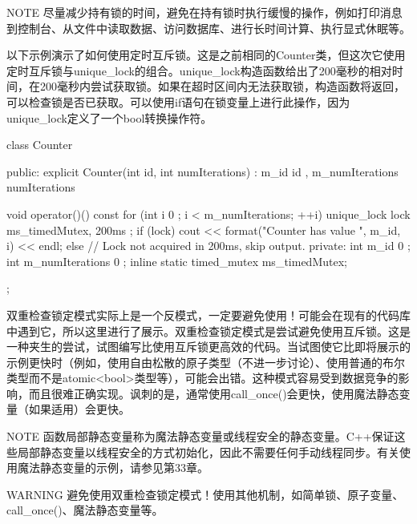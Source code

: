 \begin{myNotic}{NOTE}
尽量减少持有锁的时间，避免在持有锁时执行缓慢的操作，例如打印消息到控制台、从文件中读取数据、访问数据库、进行长时间计算、执行显式休眠等。
\end{myNotic}


以下示例演示了如何使用定时互斥锁。这是之前相同的Counter类，但这次它使用定时互斥锁与unique\_lock的组合。unique\_lock构造函数给出了200毫秒的相对时间，在200毫秒内尝试获取锁。如果在超时区间内无法获取锁，构造函数将返回，可以检查锁是否已获取。可以使用if语句在锁变量上进行此操作，因为unique\_lock定义了一个bool转换操作符。

\begin{cpp}
class Counter
{
    public:
        explicit Counter(int id, int numIterations)
            : m_id { id }, m_numIterations { numIterations } { }

        void operator()() const
        {
            for (int i { 0 }; i < m_numIterations; ++i) {
                unique_lock lock { ms_timedMutex, 200ms };
                if (lock) {
                    cout << format("Counter {} has value {}", m_id, i) << endl;
                } else {
                    // Lock not acquired in 200ms, skip output.
                }
            }
        }
    private:
        int m_id { 0 };
        int m_numIterations { 0 };
        inline static timed_mutex ms_timedMutex;
};
\end{cpp}



双重检查锁定模式实际上是一个反模式，一定要避免使用！可能会在现有的代码库中遇到它，所以这里进行了展示。双重检查锁定模式是尝试避免使用互斥锁。这是一种夹生的尝试，试图编写比使用互斥锁更高效的代码。当试图使它比即将展示的示例更快时（例如，使用自由松散的原子类型（不进一步讨论）、使用普通的布尔类型而不是atomic<bool>类型等），可能会出错。这种模式容易受到数据竞争的影响，而且很难正确实现。讽刺的是，通常使用call\_once()会更快，使用魔法静态变量（如果适用）会更快。

\begin{myNotic}{NOTE}
函数局部静态变量称为魔法静态变量或线程安全的静态变量。C++保证这些局部静态变量以线程安全的方式初始化，因此不需要任何手动线程同步。有关使用魔法静态变量的示例，请参见第33章。
\end{myNotic}

\begin{myWarning}{WARNING}
避免使用双重检查锁定模式！使用其他机制，如简单锁、原子变量、call\_once()、魔法静态变量等。
\end{myWarning}

